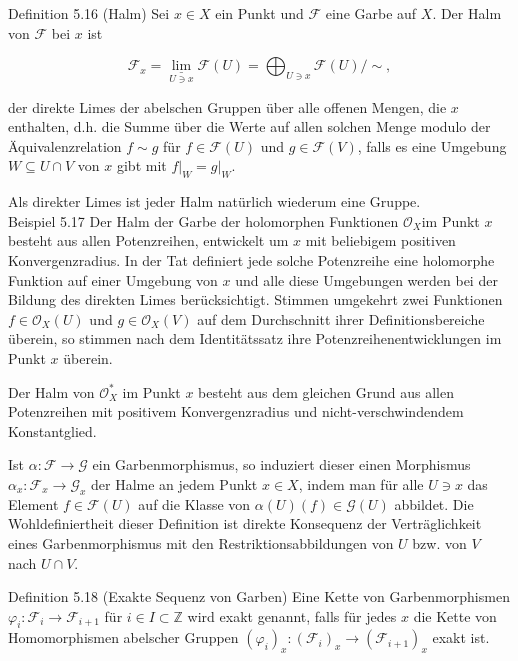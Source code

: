 \documentclass[10pt, letterpaper]{article}
\begin{document}
Definition 5.16 (Halm) Sei $x \in X$ ein Punkt und $\mathcal{F}$ eine Garbe auf $X$. Der Halm von $\mathcal{F}$ bei $x$ ist

$$
\mathcal{F}_{x}=\underset{U \ni x}{\underline{\lim }} \mathcal{F}(U)=\bigoplus_{U \ni x} \mathcal{F}(U) / \sim,
$$

der direkte Limes der abelschen Gruppen über alle offenen Mengen, die $x$ enthalten, d.h. die Summe über die Werte auf allen solchen Menge modulo der Äquivalenzrelation $f \sim g$ für $f \in \mathcal{F}(U)$ und $g \in \mathcal{F}(V)$, falls es eine Umgebung $W \subseteq U \cap V$ von $x$ gibt mit $\left.f\right|_{W}=\left.g\right|_{W}$.

Als direkter Limes ist jeder Halm natürlich wiederum eine Gruppe.\\
Beispiel 5.17 Der Halm der Garbe der holomorphen Funktionen $\mathcal{O}_{X} \mathrm{im}$ Punkt $x$ besteht aus allen Potenzreihen, entwickelt um $x$ mit beliebigem positiven Konvergenzradius. In der Tat definiert jede solche Potenzreihe eine holomorphe Funktion auf einer Umgebung von $x$ und alle diese Umgebungen werden bei der Bildung des direkten Limes berücksichtigt. Stimmen umgekehrt zwei Funktionen $f \in \mathcal{O}_{X}(U)$ und $g \in \mathcal{O}_{X}(V)$ auf dem Durchschnitt ihrer Definitionsbereiche überein, so stimmen nach dem Identitätssatz ihre Potenzreihenentwicklungen im Punkt $x$ überein.

Der Halm von $\mathcal{O}_{X}^{*}$ im Punkt $x$ besteht aus dem gleichen Grund aus allen Potenzreihen mit positivem Konvergenzradius und nicht-verschwindendem Konstantglied.

Ist $\alpha: \mathcal{F} \rightarrow \mathcal{G}$ ein Garbenmorphismus, so induziert dieser einen Morphismus $\alpha_{x}: \mathcal{F}_{x} \rightarrow \mathcal{G}_{x}$ der Halme an jedem Punkt $x \in X$, indem man für alle $U \ni x$ das Element $f \in \mathcal{F}(U)$ auf die Klasse von $\alpha(U)(f) \in \mathcal{G}(U)$ abbildet. Die Wohldefiniertheit dieser Definition ist direkte Konsequenz der Verträglichkeit eines Garbenmorphismus mit den Restriktionsabbildungen von $U$ bzw. von $V$ nach $U \cap V$.

Definition 5.18 (Exakte Sequenz von Garben) Eine Kette von Garbenmorphismen $\varphi_{i}: \mathcal{F}_{i} \rightarrow \mathcal{F}_{i+1}$ für $i \in I \subset \mathbb{Z}$ wird exakt genannt, falls für jedes $x$ die Kette von Homomorphismen abelscher Gruppen $\left(\varphi_{i}\right)_{x}:\left(\mathcal{F}_{i}\right)_{x} \rightarrow\left(\mathcal{F}_{i+1}\right)_{x}$ exakt ist.
\end{document}
